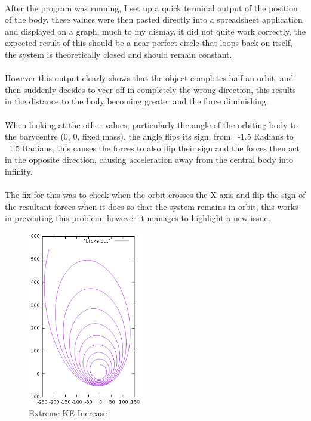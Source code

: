 \paragraph{}
After the program was running, I set up a quick terminal output of the position of the body, these values were then pasted directly into a spreadsheet application and displayed on a graph, much to my dismay, it did not quite work correctly, the expected result of this should be a near perfect circle that loops back on itself, the system is theoretically closed and should remain constant.

\paragraph{}
However this output clearly shows that the object completes half an orbit, and then suddenly decides to veer off in completely the wrong direction, this results in the distance to the body becoming greater and the force diminishing.

\paragraph{}
When looking at the other values, particularly the angle of the orbiting body to the barycentre (0, 0, fixed mass), the angle flips its sign, from ~-1.5 Radians to ~1.5 Radians, this causes the forces to also flip their sign and the forces then act in the opposite direction, causing acceleration away from the central body into infinity.

\paragraph{}
The fix for this was to check when the orbit crosses the X axis and flip the sign of the resultant forces when it does so that the system remains in orbit, this works in preventing this problem, however it manages to highlight a new issue.

\begin{figure}
  \centering
  \includegraphics[width=0.45\textwidth]{img/notworking1amp.png}
  \caption{Extreme KE Increase}
  \vspace{-10pt}
\end{figure}

